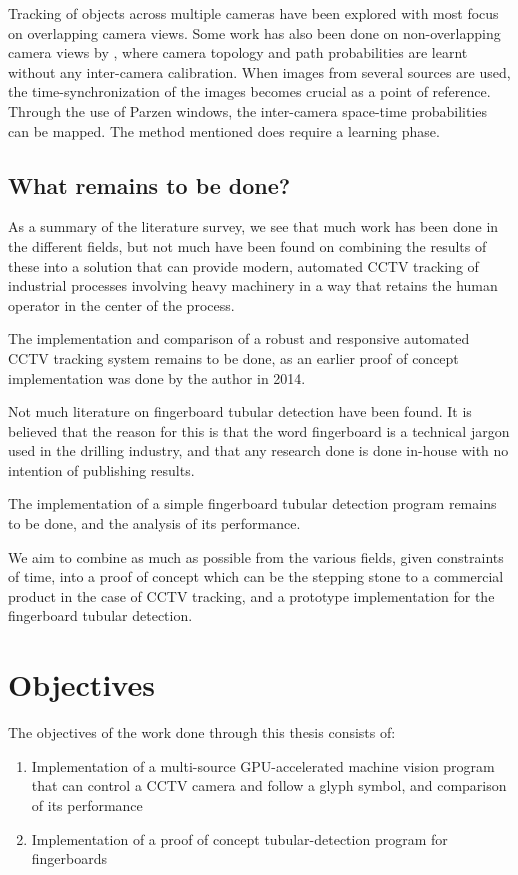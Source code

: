 Tracking of objects across multiple cameras have been explored with most focus on overlapping camera views. Some work has also been done on non-overlapping camera views by \citet{javed03}, where camera topology and path probabilities are learnt without any inter-camera calibration. When images from several sources are used, the time-synchronization of the images becomes crucial as a point of reference. Through the use of Parzen windows, the inter-camera space-time probabilities can be mapped. The method mentioned does require a learning phase.

\subsection{What remains to be done?}
As a summary of the literature survey, we see that much work has been done in the different fields, but not much have been found on combining the results of these into a solution that can provide modern, automated CCTV tracking of industrial processes involving heavy machinery in a way that retains the human operator in the center of the process.

The implementation and comparison of a robust and responsive automated CCTV tracking system remains to be done, as an earlier proof of concept implementation was done by the author in 2014.


Not much literature on fingerboard tubular detection have been found. It is believed that the reason for this is that the word fingerboard is a technical jargon used in the drilling industry, and that any research done is done in-house with no intention of publishing results.

The implementation of a simple fingerboard tubular detection program remains to be done, and the analysis of its performance.

We aim to combine as much as possible from the various fields, given constraints of time, into a proof of concept which can be the stepping stone to a commercial product in the case of CCTV tracking, and a prototype implementation for the fingerboard tubular detection.

\section{Objectives}
The objectives of the work done through this thesis consists of:
\begin{enumerate}
  \item Implementation of a multi-source GPU-accelerated machine vision program that can control a CCTV camera and follow a glyph symbol, and comparison of its performance
  \item Implementation of a proof of concept tubular-detection program for fingerboards
\end{enumerate}

